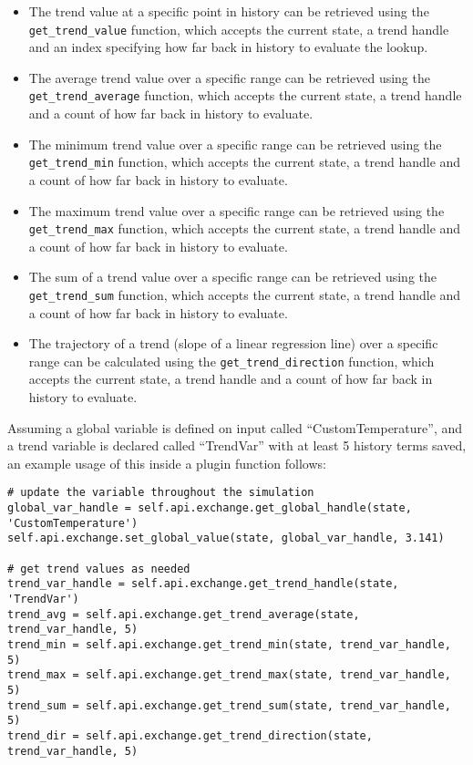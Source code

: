 \begin{itemize}
    \item The trend value at a specific point in history can be retrieved using the \verb=get_trend_value= function, which accepts the current state, a trend handle and an index specifying how far back in history to evaluate the lookup.
    \item The average trend value over a specific range can be retrieved using the \verb=get_trend_average= function, which accepts the current state, a trend handle and a count of how far back in history to evaluate.
    \item The minimum trend value over a specific range can be retrieved using the \verb=get_trend_min= function, which accepts the current state, a trend handle and a count of how far back in history to evaluate.
    \item The maximum trend value over a specific range can be retrieved using the \verb=get_trend_max= function, which accepts the current state, a trend handle and a count of how far back in history to evaluate.
    \item The sum of a trend value over a specific range can be retrieved using the \verb=get_trend_sum= function, which accepts the current state, a trend handle and a count of how far back in history to evaluate.
    \item The trajectory of a trend (slope of a linear regression line) over a specific range can be calculated using the \verb=get_trend_direction= function, which accepts the current state, a trend handle and a count of how far back in history to evaluate.
\end{itemize}

Assuming a global variable is defined on input called ``CustomTemperature'', and a trend variable is declared called ``TrendVar'' with at least 5 history terms saved, an example usage of this inside a plugin function follows:

\begin{lstlisting}
# update the variable throughout the simulation
global_var_handle = self.api.exchange.get_global_handle(state, 'CustomTemperature')
self.api.exchange.set_global_value(state, global_var_handle, 3.141)

# get trend values as needed
trend_var_handle = self.api.exchange.get_trend_handle(state, 'TrendVar')
trend_avg = self.api.exchange.get_trend_average(state, trend_var_handle, 5)
trend_min = self.api.exchange.get_trend_min(state, trend_var_handle, 5)
trend_max = self.api.exchange.get_trend_max(state, trend_var_handle, 5)
trend_sum = self.api.exchange.get_trend_sum(state, trend_var_handle, 5)
trend_dir = self.api.exchange.get_trend_direction(state, trend_var_handle, 5)
\end{lstlisting}

